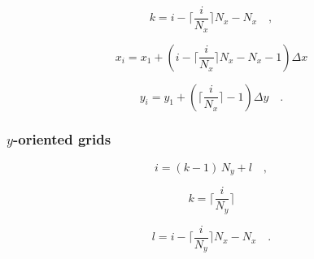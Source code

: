 \documentclass[manuscript,revised]{geophysics}
\begin{document}
\begin{equation}
k = i - \Bigg\lceil \frac{i}{N_{x}} \Bigg\rceil N_{x} - N_{x} \quad ,
\label{eq:k-x-oriented}
\end{equation}

\begin{equation}
x_{i} = x_{1} + \left( i - \Bigg\lceil \frac{i}{N_{x}} \Bigg\rceil N_{x} - 
N_{x} - 1 \right) \Delta x
\label{eq:xi-x-oriented}
\end{equation}

\begin{equation}
y_{i} = y_{1} + \left( \Bigg\lceil \frac{i}{N_{x}} \Bigg\rceil - 1 \right)
\Delta y \quad .
\label{eq:yi-x-oriented}
\end{equation}

\subsubsection{$y$-oriented grids}

\begin{equation}
i = (k - 1) \, N_{y} + l \quad ,
\label{eq:i-y-oriented}
\end{equation}

\begin{equation}
k = \Bigg\lceil \frac{i}{N_{y}} \Bigg\rceil
\label{eq:k-y-oriented}
\end{equation}

\begin{equation}
l = i - \Bigg\lceil \frac{i}{N_{y}} \Bigg\rceil N_{x} - N_{x} \quad .
\label{eq:l-y-oriented}
\end{equation}
\end{document}
